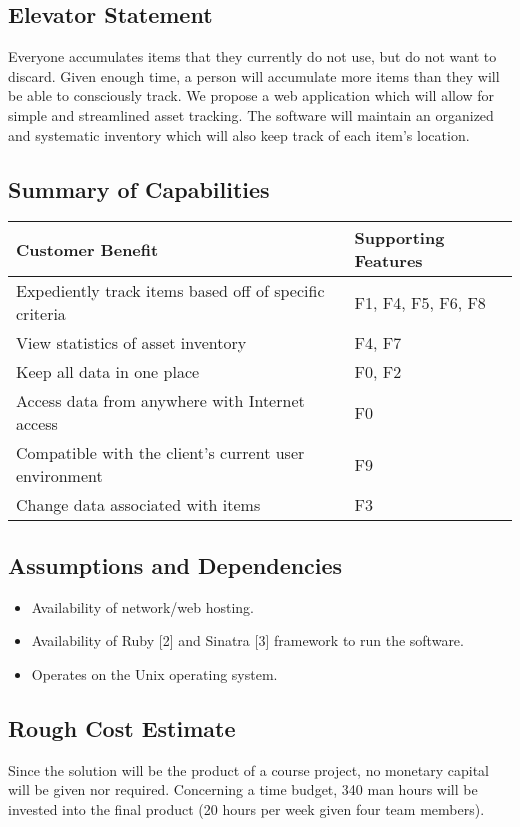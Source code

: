 \documentclass{article}
\begin{document}
\subsection{Elevator Statement}
Everyone accumulates items that they currently do not use, but do not want to discard.  Given enough time, a person will accumulate more items than they will be able to consciously track. We propose a web application which will allow for simple and streamlined asset tracking. The software will maintain an organized and systematic inventory which will also keep track of each item's location.

\subsection{Summary of Capabilities}
\begin{tabular}{ | p{4.0in} | p{2.0in} | }
\hline
\textbf{Customer Benefit} & \textbf{Supporting Features}\\
\hline
\hline
Expediently track items based off of specific criteria & F1, F4, F5, F6, F8\\
\hline
View statistics of asset inventory & F4, F7\\
\hline
Keep all data in one place & F0, F2\\
\hline
Access data from anywhere with Internet access & F0\\
\hline
Compatible with the client's current user environment & F9\\
\hline
Change data associated with items & F3\\
\hline
\end{tabular}
\clearpage
\subsection{Assumptions and Dependencies}
\begin{itemize}
\item Availability of network/web hosting.
\item Availability of Ruby [2] and Sinatra [3] framework to run the software.
\item Operates on the Unix operating system.
\end{itemize}

\subsection{Rough Cost Estimate}
Since the solution will be the product of a course project, no monetary capital will be given nor required.  Concerning a time budget, 340 man hours will be invested into the final product (20 hours per week given four team members).
\end{document}
